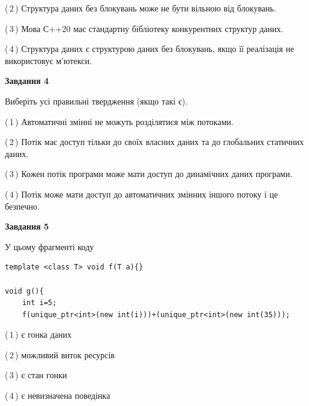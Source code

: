 \documentclass[12pt, ukrainian]{article}
\begin{document}
\begin {large}
{(\,2\,) Структура даних без блокувань може не бути вільною від блокувань.%

(\,3\,) Мова С++20 має стандартну бібліотеку конкурентних структур даних.%

(\,4\,) Структура даних є структурою даних без блокувань, якщо її реалізація не використовує м’ютекси.%



\begin{center}
\textbf{Завдання 4}
\end{center}
Виберіть усі правильні твердження (якщо такі є).\par
\vspace{2mm}

(\,1\,) Автоматичні змінні не можуть розділятися між потоками.%

(\,2\,) Потік має доступ тільки до своїх власних даних та до глобальних статичних даних.%

(\,3\,) Кожен потік програми може мати доступ до динамічних даних програми.%

(\,4\,) Потік може мати доступ до автоматичних змінних іншого потоку і це безпечно.%



\begin{center}
\textbf{Завдання 5}
\end{center}
У цьому фрагменті коду
\begin{verbatim}
template <class T> void f(T a){}

void g(){
    int i=5;
    f(unique_ptr<int>(new int(i)))+(unique_ptr<int>(new int(35)));
\end{verbatim}
(\,1\,) є гонка даних%

(\,2\,) можливий виток ресурсів%

(\,3\,) є стан гонки%

(\,4\,) є невизначена поведінка%


}
\end {large}
\end{document}
